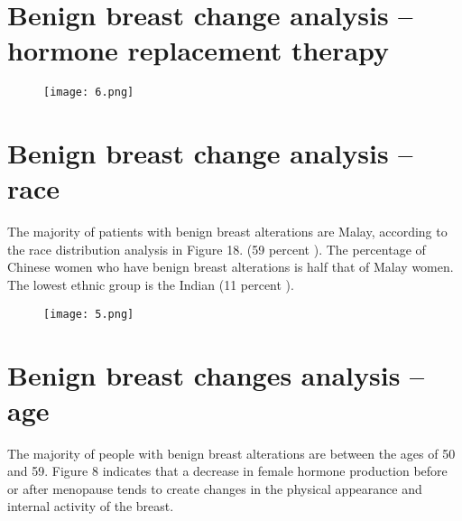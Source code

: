 \documentclass[10pt,a4paper,twoside]{article}
\begin{document}
\section{Benign breast change analysis – hormone replacement
therapy}


\begin{figure}
  \texttt{[image: 6.png]}
  
  
  
\end{figure}
\section{Benign breast change analysis – race}
The majority of patients with benign breast alterations are Malay, according to the race distribution analysis in Figure 18. (59 percent ).
The percentage of Chinese women who have benign breast alterations is half that of Malay women. The lowest ethnic group is the Indian (11 percent ).
\begin{figure}
  \texttt{[image: 5.png]}
  
  
  
\end{figure}


\section{Benign breast changes analysis – age}
The majority of people with benign breast alterations are between the ages of 50 and 59. Figure 8 indicates that a decrease in female hormone production before or after menopause tends to create changes in the physical appearance and internal activity of the breast.
\end{document}
